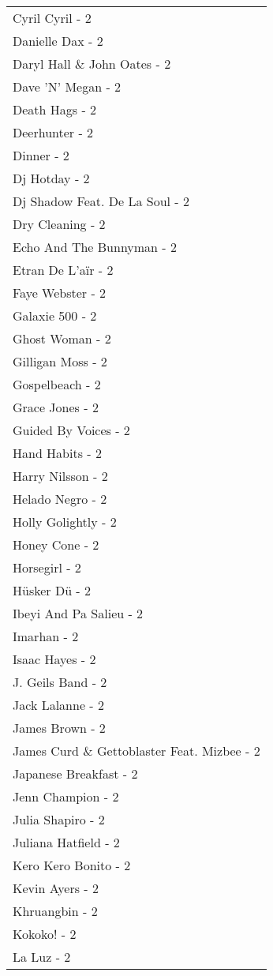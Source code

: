 \documentclass[
]{article}
\begin{document}
\begin{longtable}{l}
Cyril Cyril - 2 \\ 
Danielle Dax - 2 \\ 
Daryl Hall \& John Oates - 2 \\ 
Dave 'N' Megan - 2 \\ 
Death Hags - 2 \\ 
Deerhunter - 2 \\ 
Dinner - 2 \\ 
Dj Hotday - 2 \\ 
Dj Shadow Feat. De La Soul - 2 \\ 
Dry Cleaning - 2 \\ 
Echo And The Bunnyman - 2 \\ 
Etran De L'aïr - 2 \\ 
Faye Webster - 2 \\ 
Galaxie 500 - 2 \\ 
Ghost Woman - 2 \\ 
Gilligan Moss - 2 \\ 
Gospelbeach - 2 \\ 
Grace Jones - 2 \\ 
Guided By Voices - 2 \\ 
Hand Habits - 2 \\ 
Harry Nilsson - 2 \\ 
Helado Negro - 2 \\ 
Holly Golightly - 2 \\ 
Honey Cone - 2 \\ 
Horsegirl - 2 \\ 
Hüsker Dü - 2 \\ 
Ibeyi And Pa Salieu - 2 \\ 
Imarhan - 2 \\ 
Isaac Hayes - 2 \\ 
J. Geils Band - 2 \\ 
Jack Lalanne - 2 \\ 
James Brown - 2 \\ 
James Curd \& Gettoblaster Feat. Mizbee - 2 \\ 
Japanese Breakfast - 2 \\ 
Jenn Champion - 2 \\ 
Julia Shapiro - 2 \\ 
Juliana Hatfield - 2 \\ 
Kero Kero Bonito - 2 \\ 
Kevin Ayers - 2 \\ 
Khruangbin - 2 \\ 
Kokoko! - 2 \\ 
La Luz - 2 \\ 

\end{longtable}
\end{document}
